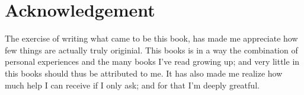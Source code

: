 \section*{Acknowledgement}

The exercise of writing what came to be this book, has made me appreciate how few things are actually truly originial. This books is in a way the combination of personal experiences and the many books I've read growing up; and very little in this books should thus be attributed to me. It has also made me realize how much help I can receive if I only ask; and for that I'm deeply greatful. 

